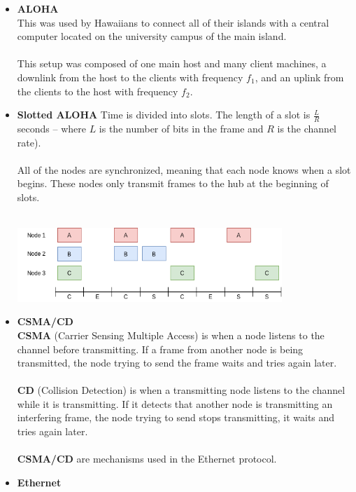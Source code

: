 \documentclass{article}
\begin{document}
\begin{itemize}
	\item \textbf{ALOHA}
	\vspace{.2cm} \\
	This was used by Hawaiians to connect all of their islands with a central computer located on the university campus of the main island. \\ \\
	This setup was composed of one main host and many client machines, a downlink from the host to the clients with frequency $f_1$, and an uplink from the clients to the host with frequency $f_2$.
	
	\item \textbf{Slotted ALOHA}
	Time is divided into slots. The length of a slot is $\frac{L}{R}$ seconds -- where $L$ is the number of bits in the frame and $R$ is the channel rate). \\ \\
	All of the nodes are synchronized, meaning that each node knows when a slot begins. These nodes only transmit frames to the hub at the beginning of slots. \\ \\
	
	\centerline{\includegraphics[width=10cm]{./assets/slotted-aloha.png}}
	\vspace{.4cm}
	
	\item \textbf{CSMA/CD}
	\vspace{.2cm} \\
	\textbf{CSMA} (Carrier Sensing Multiple Access) is when a node listens to the channel before transmitting. If a frame from another node is being transmitted, the node trying to send the frame waits and tries again later. \\ \\
	\textbf{CD} (Collision Detection) is when a transmitting node listens to the channel while it is transmitting. If it detects that another node is transmitting an interfering frame, the node trying to send stops transmitting, it waits and tries again later. \\ \\
	\textbf{CSMA/CD} are mechanisms used in the Ethernet protocol.	
	
	\item \textbf{Ethernet}
\end{itemize}
\end{document}
